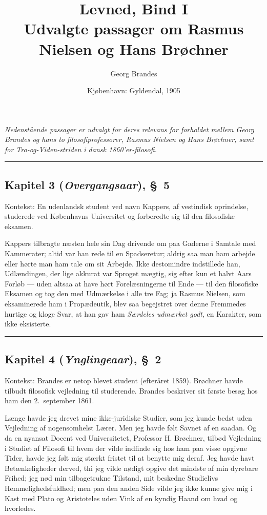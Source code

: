 \documentclass[12pt,a4paper]{article}
\title{\textbf{Levned}, Bind I\\[6pt]
  \large Udvalgte passager om Rasmus Nielsen og Hans Brøchner}
\author{Georg Brandes}
\date{Kjøbenhavn: Gyldendal, 1905}
\begin{document}
\maketitle
\thispagestyle{fancy}

\bigskip

\noindent\textit{Nedenstående passager er udvalgt for deres relevans for
forholdet mellem Georg Brandes og hans to filosofiprofessorer, Rasmus
Nielsen og Hans Brøchner, samt for Tro-og-Viden-striden i dansk
1860'er-filosofi.}

\bigskip\hrule\bigskip

\subsection*{Kapitel 3 (\emph{Overgangsaar}), §~5}

\noindent Kontekst: En udenlandsk student ved navn Kappers, af vestindisk
oprindelse, studerede ved Københavns Universitet og forberedte sig til den
filosofiske eksamen.

\medskip

Kappers tilbragte næsten hele sin Dag drivende om paa Gaderne
i Samtale med Kammerater; altid var han rede til en Spadseretur; aldrig
saa man ham arbejde eller hørte man ham tale om sit Arbejde. Ikke
destomindre indstillede han, Udlændingen, der lige akkurat var Sproget
mægtig, sig efter kun et halvt Aars Forløb --- uden altsaa at have hørt
Forelæsningerne til Ende --- til den filosofiske Eksamen og tog den med
Udmærkelse i alle tre Fag; ja Rasmus Nielsen, som eksaminerede ham i
Propædeutik, blev saa begejstret over denne Fremmedes hurtige og kloge
Svar, at han gav ham \textit{Særdeles udmærket godt}, en Karakter, som
ikke eksisterte.

\bigskip\hrule\bigskip

\subsection*{Kapitel 4 (\emph{Ynglingeaar}), §~2}

\noindent Kontekst: Brandes er netop blevet student (efteråret 1859).
Brøchner havde tilbudt filosofisk vejledning til studerende. Brandes
beskriver sit første besøg hos ham den 2.\ september 1861.

\medskip

Længe havde jeg drevet mine ikke-juridiske Studier, som jeg
kunde bedst uden Vejledning af nogensomhelst Lærer. Men jeg havde følt
Savnet af en saadan. Og da en nyansat Docent ved Universitetet,
Professor H. Brøchner, tilbød Vejledning i Studiet af Filosofi til
hvem der vilde indfinde sig hos ham paa visse opgivne Tider, havde jeg
følt mig stærkt fristet til at benytte mig deraf. Jeg havde havt
Betænkeligheder derved, thi jeg vilde nødigt opgive det mindste af min
dyrebare Frihed; jeg nød min tilbagetrukne Tilstand, mit beskedne
Studielivs Hemmelighedsfuldhed; men paa den anden Side vilde jeg ikke
kunne give mig i Kast med Plato og Aristoteles uden Vink af en kyndig
Haand om hvad og hvorledes.
\end{document}

